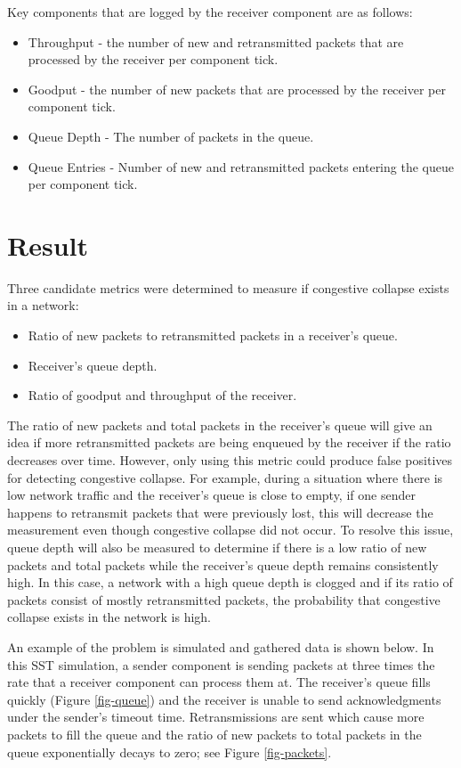 \documentclass{article}
\begin{document}
Key components that are logged by the receiver component are as follows:

\begin{itemize}
	\item Throughput - the number of new and retransmitted packets that are processed by the receiver per component tick.
	\item Goodput - the number of new packets that are processed by the receiver per component tick.
	\item Queue Depth - The number of packets in the queue.
	\item Queue Entries - Number of new and retransmitted packets entering the queue per component tick.
\end{itemize}


\section{Result} %

Three candidate metrics were determined to measure if congestive collapse exists in a network:

\begin{itemize}
	\item Ratio of new packets to retransmitted packets in a receiver's queue.
	\item Receiver's queue depth.
	\item Ratio of goodput and throughput of the receiver.
\end{itemize}

The ratio of new packets and total packets in the receiver's queue will give an idea if more retransmitted packets are being enqueued by the receiver if the ratio decreases over time. However, only using this metric could produce false positives for detecting congestive collapse. For example, during a situation where there is low network traffic and the receiver's queue is close to empty, if one sender happens to retransmit packets that were previously lost, this will decrease the measurement even though congestive collapse did not occur.
To resolve this issue, queue depth will also be measured to determine if there is a low ratio of new packets and total packets while the receiver's queue depth remains consistently high. In this case, a network with a high queue depth is clogged and if its ratio of packets consist of mostly retransmitted packets, the probability that congestive collapse exists in the network is high.

An example of the problem is simulated and gathered data is shown below. In this SST simulation, a sender component is sending packets at three times the rate that a receiver component can process them at. The receiver's queue fills quickly (Figure \ref{fig-queue}) and the receiver is unable to send acknowledgments under the sender's timeout time. Retransmissions are sent which cause more packets to fill the queue and the ratio of new packets to total packets in the queue exponentially decays to zero; see Figure \ref{fig-packets}.
\end{document}

